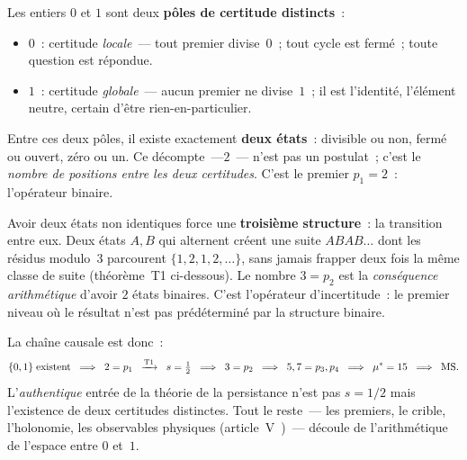 \documentclass[12pt,a4paper]{article}
\begin{document}
\begin{remarque}
\label{rem:genesis}
Les entiers $0$ et $1$ sont deux \textbf{pôles de certitude distincts}~:
\begin{itemize}[nosep]
\item $0$~: certitude \emph{locale}~--- tout premier divise~$0$~;
  tout cycle est fermé~; toute question est répondue.
\item $1$~: certitude \emph{globale}~--- aucun premier ne divise~$1$~;
  il est l'identité, l'élément neutre, certain d'être rien-en-particulier.
\end{itemize}

Entre ces deux pôles, il existe exactement \textbf{deux états}~:
divisible ou non, fermé ou ouvert, zéro ou un. Ce décompte~---$2$~---
n'est pas un postulat~; c'est le \emph{nombre de positions entre les
deux certitudes}. C'est le premier $p_1 = 2$~: l'opérateur binaire.

Avoir deux états non identiques force une \textbf{troisième structure}~:
la transition entre eux. Deux états $A, B$ qui alternent créent une
suite $A B A B \ldots$ dont les résidus modulo~$3$ parcourent
$\{1, 2, 1, 2, \ldots\}$, sans jamais frapper deux fois la même classe
de suite (théorème~T1 ci-dessous). Le nombre $3 = p_2$ est la
\emph{conséquence arithmétique} d'avoir $2$ états binaires. C'est
l'opérateur d'incertitude~: le premier niveau où le résultat n'est
pas prédéterminé par la structure binaire.

La chaîne causale est donc~:
\begin{equation}
  \{0, 1\} \;\text{existent}
  \;\;\Longrightarrow\;\;
  2 = p_1
  \;\;\xrightarrow{\text{T1}}\;\;
  s = \tfrac{1}{2}
  \;\;\Longrightarrow\;\;
  3 = p_2
  \;\;\Longrightarrow\;\;
  5, 7 = p_3, p_4
  \;\;\Longrightarrow\;\;
  {\mu^{*}} = 15
  \;\;\Longrightarrow\;\;
  \text{MS.}
  \label{eq:genesis}
\end{equation}
L'\emph{authentique} entrée de la théorie de la persistance n'est pas
$s = 1/2$ mais l'existence de deux certitudes distinctes. Tout le
reste~--- les premiers, le crible, l'holonomie, les observables
physiques (article~V~\cite{companion_M5})~--- découle de l'arithmétique
de l'espace entre $0$ et~$1$.
\end{remarque}
\end{document}
